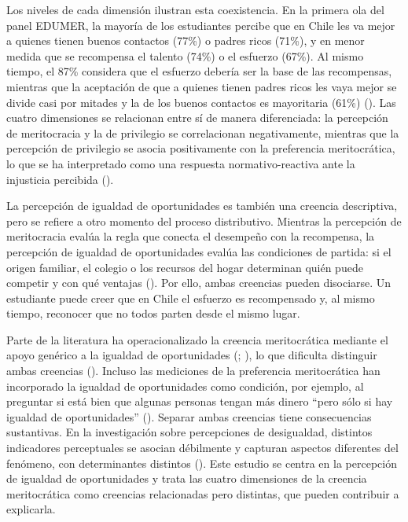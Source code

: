 \documentclass[
  spanish,
  a4paper,
  oneside]{scrbook}
\begin{document}
Los niveles de cada dimensión ilustran esta coexistencia. En la primera
ola del panel EDUMER, la mayoría de los estudiantes percibe que en Chile
les va mejor a quienes tienen buenos contactos (77\%) o padres ricos
(71\%), y en menor medida que se recompensa el talento (74\%) o el
esfuerzo (67\%). Al mismo tiempo, el 87\% considera que el esfuerzo
debería ser la base de las recompensas, mientras que la aceptación de
que a quienes tienen padres ricos les vaya mejor se divide casi por
mitades y la de los buenos contactos es mayoritaria (61\%)
(). Las cuatro
dimensiones se relacionan entre sí de manera diferenciada: la percepción
de meritocracia y la de privilegio se correlacionan negativamente,
mientras que la percepción de privilegio se asocia positivamente con la
preferencia meritocrática, lo que se ha interpretado como una respuesta
normativo-reactiva ante la injusticia percibida
().

La percepción de igualdad de oportunidades es también una creencia
descriptiva, pero se refiere a otro momento del proceso distributivo.
Mientras la percepción de meritocracia evalúa la regla que conecta el
desempeño con la recompensa, la percepción de igualdad de oportunidades
evalúa las condiciones de partida: si el origen familiar, el colegio o
los recursos del hogar determinan quién puede competir y con qué
ventajas (). Por ello, ambas
creencias pueden disociarse. Un estudiante puede creer que en Chile el
esfuerzo es recompensado y, al mismo tiempo, reconocer que no todos
parten desde el mismo lugar.

Parte de la literatura ha operacionalizado la creencia meritocrática
mediante el apoyo genérico a la igualdad de oportunidades
(;
), lo que dificulta
distinguir ambas creencias (). Incluso las mediciones de la preferencia meritocrática
han incorporado la igualdad de oportunidades como condición, por
ejemplo, al preguntar si está bien que algunas personas tengan más
dinero ``pero sólo si hay igualdad de oportunidades''
().
Separar ambas creencias tiene consecuencias sustantivas. En la
investigación sobre percepciones de desigualdad, distintos indicadores
perceptuales se asocian débilmente y capturan aspectos diferentes del
fenómeno, con determinantes distintos
(). Este
estudio se centra en la percepción de igualdad de oportunidades y trata
las cuatro dimensiones de la creencia meritocrática como creencias
relacionadas pero distintas, que pueden contribuir a explicarla.
\end{document}
